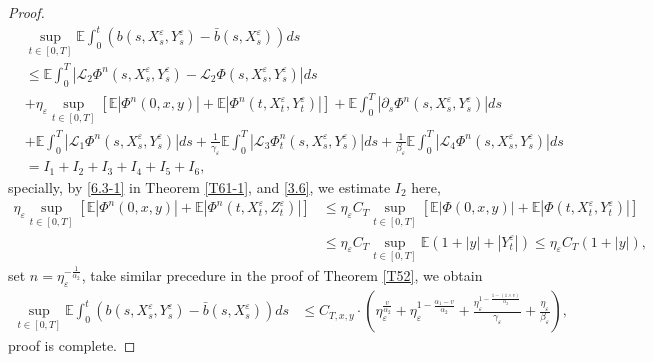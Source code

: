 \documentclass[11pt,reqno]{amsart}
\numberwithin{equation}{section}
\begin{document}
\begin{proof}
\begin{equation}
	\begin{split}
		&	\sup_{t\in [0,T]}\mathbb{E}\int_{0}^{t}\left( b(s,X_{s}^{\varepsilon},Y_{s}^{\varepsilon})-\bar{b}(s,X_{s}^{\varepsilon})\right)ds\\
		&
	\leq\mathbb{E} \int_{0}^{T}\left|\mathcal{L}_{2}\Phi^{n}(s,X_{s}^{\varepsilon},Y_{s}^{\varepsilon})-\mathcal{L}_{2}\Phi(s,X_{s}^{\varepsilon},Y_{s}^{\varepsilon})\right|ds\\
	&+\eta_{\varepsilon}\sup_{t\in [0,T]}\left[ \mathbb{E}|\Phi^{n}(0,x,y)|+\mathbb{E}|\Phi^{n}(t,X_{t}^{\varepsilon},Y_{t}^{\varepsilon})|\right]  +\mathbb{E}\int_{0}^{T}|\partial_{s}\Phi^{n}(s,X_{s}^{\varepsilon},Y_{s}^{\varepsilon})|ds\\
	&+\mathbb{E}\int_{0}^{T} |\mathcal{L}_{1}\Phi^{n}(s,X_{s}^{\varepsilon},Y_{s}^{\varepsilon})|ds+\frac{1}{\gamma_{\varepsilon}} \mathbb{E}\int_{0}^{T}|\mathcal{L}_{3}\Phi_{t}^{n}(s,X_{s}^{\varepsilon},Y_{s}^{\varepsilon})|ds+\frac{1}{\beta_{\varepsilon}} \mathbb{E}\int_{0}^{T}|\mathcal{L}_{4}\Phi^{n}(s,X_{s}^{\varepsilon},Y_{s}^{\varepsilon})|ds	\\
	&=I_{1}+I_{2}+I_{3}+I_{4}+I_{5}+I_{6},
	\end{split}
\end{equation}
specially, by \eqref{6.3-1} in Theorem \ref{T61-1}, and \eqref{3.6},  we estimate $I_{2}$ here,
\begin{equation}
	\begin{split}
	\eta_{\varepsilon}\sup_{t\in [0,T]}\left[  \mathbb{E}|\Phi^{n}(0,x,y)|+\mathbb{E}|\Phi^{n}(t,X_{t}^{\varepsilon},Z_{t}^{\varepsilon})|\right]  &\leq \eta_{\varepsilon}C_{T}\sup_{t\in [0,T]}\left[  \mathbb{E}|\Phi(0,x,y)|+\mathbb{E}|\Phi(t,X_{t}^{\varepsilon},Y_{t}^{\varepsilon})|\right] \\
	&\leq \eta_{\varepsilon}C_{T}\sup_{t\in [0,T]}\mathbb{E}(1+|y|+|Y_{t}^{\varepsilon}|)\leq \eta_{\varepsilon}C_{T}(1+|y|),
	\end{split}\nonumber
\end{equation}
set $n=\eta_{\varepsilon}^{-\frac{1}{\alpha_{2}}}$, take similar precedure in the proof of Theorem \ref{T52},  we obtain
\begin{equation}\label{6.35}
	\begin{split}
	\sup_{t\in [0,T]}\mathbb{E}\int_{0}^{t}\left( b(s,X_{s}^{\varepsilon},Y_{s}^{\varepsilon})-\bar{b}(s,X_{s}^{\varepsilon})\right)ds&\leq C_{T,x,y}\cdot \left(\eta_{\varepsilon}^{\frac{v}{\alpha_{2}}}+\eta_{\varepsilon}^{1-\frac{\alpha_{1}-v}{\alpha_{2}}}+\frac{\eta_{\varepsilon}^{1-\frac{1-(1\wedge v)}{\alpha_{2}}}}{\gamma_{\varepsilon}}+\frac{\eta_{\varepsilon}}{\beta_{\varepsilon}}\right),
	\end{split}
\end{equation}
proof is complete.
\end{proof}
\end{document}
